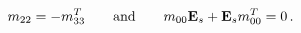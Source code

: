 \begin{equation}\label{Mconstraints}
m_{22} = - m_{33}^T \qquad \mathrm{and}\qquad m_{00}\mathrm{\bf E}_s +
\mathrm{\bf E}_s m_{00}^T=0\,.
\end{equation}

